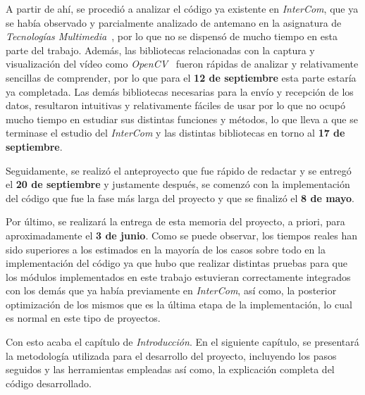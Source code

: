 A partir de ahí, se procedió a analizar el código ya existente en \textit{InterCom}, que ya se había observado y parcialmente analizado de antemano en la asignatura de \textit{Tecnologías Multimedia}~\cite{tec_multi}, por lo que no se dispensó de mucho tiempo en esta parte del trabajo. Además, las bibliotecas relacionadas con la captura y visualización del vídeo como \textit{OpenCV}~\cite{opencv} fueron rápidas de analizar y relativamente sencillas de comprender, por lo que para el \textbf{12 de septiembre} esta parte estaría ya completada. Las demás bibliotecas necesarias para la envío y recepción de los datos, resultaron intuitivas y relativamente fáciles de usar por lo que no ocupó mucho tiempo en estudiar sus distintas funciones y métodos, lo que lleva a que se terminase el estudio del \textit{InterCom} y las distintas bibliotecas en torno al \textbf{17 de septiembre}. 
\vspace{\baselineskip}

Seguidamente, se realizó el anteproyecto que fue rápido de redactar y se entregó el \textbf{20 de septiembre} y justamente después, se comenzó con la implementación del código que fue la fase más larga del proyecto y que se finalizó el \textbf{8 de mayo}. 
\vspace{\baselineskip}

Por último, se realizará la entrega de esta memoria del proyecto, a priori, para aproximadamente el \textbf{3 de junio}. Como se puede observar, los tiempos reales han sido superiores a los estimados en la mayoría de los casos sobre todo en la implementación del código ya que hubo que realizar distintas pruebas para que los módulos implementados en este trabajo estuvieran correctamente integrados con los demás que ya había previamente en \textit{InterCom}, así como, la posterior optimización de los mismos que es la última etapa de la implementación, lo cual es normal en este tipo de proyectos.

\vspace{\baselineskip}
Con esto acaba el capítulo de \textit{Introducción}. En el siguiente capítulo, se presentará la metodología utilizada para el desarrollo del proyecto, incluyendo los pasos seguidos y las herramientas empleadas así como, la explicación completa del código desarrollado. 